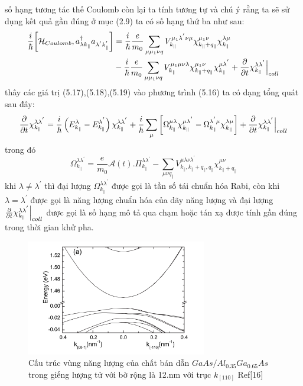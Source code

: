 số hạng tương tác thế Coulomb còn lại ta tính tương tự và chú ý rằng ta sẽ sử dụng kết quả gần đúng ở mục (2.9) ta có số hạng thứ ba như sau:
\begin{align}
\frac{i}{\hbar}\biggl[\mathcal{H}_{Coulomb},a_{\lambda k_{\parallel}}^{\dagger}a_{\lambda^{'} k_{\parallel}^{'}}\biggr]
&=\frac{i}{\hbar}\frac{e}{m_0}\sum_{\mu\mu_1\nu q}
V_{k_{\parallel}}^{\mu_1\lambda^{'}\nu\mu}\chi_{k_{\parallel}+q_{\parallel}}
^{\mu_1\nu}\chi_{k_{\parallel}}^{\lambda\mu}\notag\\
&- \frac{i}{\hbar}\frac{e}{m_0}\sum_{\mu\mu_1\nu q}
V_{k_{\parallel}}^{\mu_1\mu\nu\lambda}\chi_{k_{\parallel}+q_{\parallel}}
^{\mu_1\nu}\chi_{k_{\parallel}}^{\mu\lambda^{'}}
+\frac{\partial}{\partial t}\chi_{k_{\parallel}}^{\lambda\lambda^{'}}\Bigl\vert_{coll}
\end{align}
thây các giá trị (5.17),(5.18),(5.19) vào phương trình (5.16) ta có dạng tổng quát sau đây:
\begin{align}
\frac{\partial}{\partial t}\chi_{k_{\parallel}}^{\lambda\lambda^{'}}=
\frac{i}{\hbar}\left(E_{k_{\parallel}}^{\lambda} - E_{k_{\parallel}}^{\lambda^{'}}\right)\chi_{k_{\parallel}}^{\lambda\lambda^{'}} +\frac{i}{\hbar}\sum_{\mu}
\left[
\Omega_{k_{\parallel}}^{\mu\lambda}\chi_{k_{\parallel}}^{\mu\lambda^{'}} -
\Omega_{k_{\parallel}}^{\lambda^{'}\mu}\chi_{k_{\parallel}}^{\lambda\mu}
\right]
+\frac{\partial}{\partial t}\chi_{k_{\parallel}}^{\lambda\lambda^{'}}\Bigl\vert_{coll}
\end{align}	
trong đó 
\begin{equation}
\Omega_{k_{\parallel}}^{\lambda\lambda^{'}}=\frac{e}{m_0}\mathcal{A}(t).\Pi_{k_{\parallel}}^{\lambda\lambda^{'}} -\sum_{\mu\nu q_{\parallel}}
V_{k_{\parallel},k_{\parallel}+q_{\parallel},q_{\parallel}}^{\mu\lambda\nu\lambda^{'}}
\chi_{k_{\parallel}+q_{\parallel}}^{\mu\nu}
\end{equation}
khi $\lambda\neq\lambda^{'}$ thì đại lượng $\Omega_{k_{\parallel}}^{\lambda\lambda^{'}}$ được gọi là tần số tái chuẩn hóa Rabi, còn khi $\lambda = \lambda^{'}$ được gọi là năng lượng chuẩn hóa của dãy năng lượng và đại lượng $\frac{\partial}{\partial t}\chi_{k_{\parallel}}^{\lambda\lambda^{'}}\Bigl\vert_{coll}$ 	được gọi là số hạng mô tả qua chạm hoặc tán xạ được tính gần đúng trong thời gian khử pha.
\begin{figure}[hc]
\centering
\includegraphics[width=0.70\textwidth]{./Figures/well1.png}
\caption[cấu trúc vùng năng lượng trong quantum well]{Cấu trúc vùng năng lượng của chất bán dẫn $GaAs/Al_{0.35}Ga_{0.65}As$ trong giếng lượng tử với bờ rộng là 12.nm với trục $k_{[110]}$ Ref[16]}
\end{figure}
